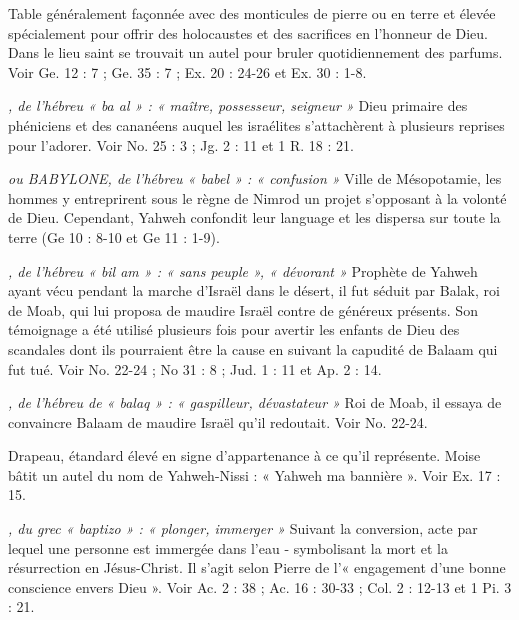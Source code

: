\begin{multicols}{2}
\textit{}\newline
Table généralement façonnée avec des monticules de pierre ou en terre et élevée spécialement pour offrir des holocaustes et des sacrifices en l'honneur de Dieu. Dans le lieu saint se trouvait un autel pour bruler quotidiennement des parfums. Voir Ge. 12 : 7 ; Ge. 35 : 7 ; Ex. 20 : 24-26 et Ex. 30 : 1-8.

\textit{, de l'hébreu « ba al » : « maître, possesseur, seigneur »}\newline
Dieu primaire des phéniciens et des cananéens auquel les israélites s’attachèrent à plusieurs reprises pour l’adorer. Voir No. 25 : 3 ; Jg. 2 : 11 et 1 R. 18 : 21.

\textit{ou BABYLONE, de l'hébreu « babel » : « confusion »}\newline
Ville de Mésopotamie, les hommes y entreprirent sous le règne de Nimrod un projet s’opposant à la volonté de Dieu. Cependant, Yahweh confondit leur language et les dispersa sur toute la terre (Ge 10 : 8-10 et Ge 11 : 1-9).

\textit{, de l'hébreu « bil am » : « sans peuple », « dévorant »}\newline
Prophète de Yahweh ayant vécu pendant la marche d’Israël dans le désert, il fut séduit par Balak, roi de Moab, qui lui proposa de maudire Israël contre de généreux présents. Son témoignage a été utilisé plusieurs fois pour avertir les enfants de Dieu des scandales dont ils pourraient être la cause en suivant la capudité de Balaam qui fut tué. Voir No. 22-24 ; No 31 : 8 ; Jud. 1 : 11 et Ap. 2 : 14.

\textit{, de l'hébreu de « balaq » : « gaspilleur, dévastateur »}\newline
Roi de Moab, il essaya de convaincre Balaam de maudire Israël qu’il redoutait. Voir No. 22-24.

\textit{}\newline
Drapeau, étandard élevé en signe d'appartenance à ce qu'il représente. Moise bâtit un autel du nom de Yahweh-Nissi : « Yahweh ma bannière ». Voir Ex. 17 : 15.

\textit{, du grec « baptizo » : « plonger, immerger »}\newline
Suivant la conversion, acte par lequel une personne est immergée dans l'eau - symbolisant la mort et la résurrection en Jésus-Christ. Il s’agit selon Pierre de l’« engagement d'une bonne conscience envers Dieu ». Voir Ac. 2 : 38 ; Ac. 16 : 30-33 ; Col. 2 : 12-13 et 1 Pi. 3 : 21.


\end{multicols}
